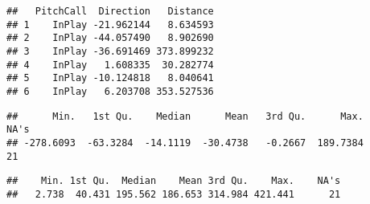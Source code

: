 \documentclass[]{article}
\newenvironment{Shaded}{\begin{snugshade}}{\end{snugshade}}
\newcommand{\KeywordTok}[1]{\textcolor[rgb]{0.13,0.29,0.53}{\textbf{#1}}}
\newcommand{\StringTok}[1]{\textcolor[rgb]{0.31,0.60,0.02}{#1}}
\newcommand{\OperatorTok}[1]{\textcolor[rgb]{0.81,0.36,0.00}{\textbf{#1}}}
\newcommand{\NormalTok}[1]{#1}
\begin{document}
\begin{Shaded}
\end{Shaded}

\begin{verbatim}
##   PitchCall  Direction   Distance
## 1    InPlay -21.962144   8.634593
## 2    InPlay -44.057490   8.902690
## 3    InPlay -36.691469 373.899232
## 4    InPlay   1.608335  30.282774
## 5    InPlay -10.124818   8.040641
## 6    InPlay   6.203708 353.527536
\end{verbatim}

\begin{Shaded}
\end{Shaded}

\begin{verbatim}
##      Min.   1st Qu.    Median      Mean   3rd Qu.      Max.      NA's 
## -278.6093  -63.3284  -14.1119  -30.4738   -0.2667  189.7384        21
\end{verbatim}

\begin{Shaded}
\end{Shaded}

\begin{verbatim}
##    Min. 1st Qu.  Median    Mean 3rd Qu.    Max.    NA's 
##   2.738  40.431 195.562 186.653 314.984 421.441      21
\end{verbatim}
\end{document}
